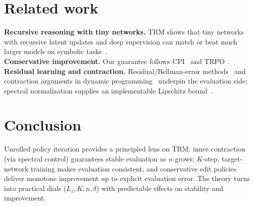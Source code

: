 \documentclass[11pt]{article}
\begin{document}
\section{Related work}
\textbf{Recursive reasoning with tiny networks.} TRM shows that tiny networks with recursive latent updates and deep supervision can match or beat much larger models on symbolic tasks~\citep{TRM2025}.\\
\textbf{Conservative improvement.} Our guarantee follows CPI~\citep{KakadeLangford2002} and TRPO~\citep{Schulman2015TRPO}.\\
\textbf{Residual learning and contraction.} Residual/Bellman-error methods~\citep{Baird1995Residual,SuttonBarto2018} and contraction arguments in dynamic programming~\citep{Denardo1967} underpin the evaluation side; spectral normalization supplies an implementable Lipschitz bound~\citep{Miyato2018}.

\section{Conclusion}
Unrolled policy iteration provides a principled lens on TRM: inner contraction (via spectral control) guarantees stable evaluation as $n$ grows; $K$-step, target-network training makes evaluation consistent; and conservative edit policies deliver monotone improvement up to explicit evaluation error. The theory turns into practical dials ($L_z,K,n,\delta$) with predictable effects on stability and improvement.



\end{document}
